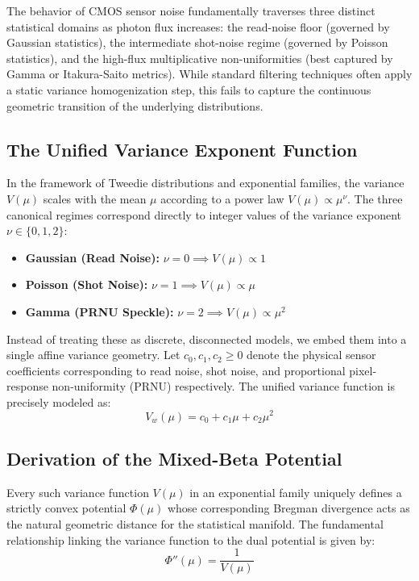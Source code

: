 
The behavior of CMOS sensor noise fundamentally traverses three distinct statistical domains as photon flux increases: the read-noise floor (governed by Gaussian statistics), the intermediate shot-noise regime (governed by Poisson statistics), and the high-flux multiplicative non-uniformities (best captured by Gamma or Itakura-Saito metrics). While standard filtering techniques often apply a static variance homogenization step, this fails to capture the continuous geometric transition of the underlying distributions.

\subsection{The Unified Variance Exponent Function}
In the framework of Tweedie distributions and exponential families, the variance $V(\mu)$ scales with the mean $\mu$ according to a power law $V(\mu) \propto \mu^\nu$. The three canonical regimes correspond directly to integer values of the variance exponent $\nu \in \{0, 1, 2\}$:
\begin{itemize}
    \item \textbf{Gaussian (Read Noise):} $\nu = 0 \implies V(\mu) \propto 1$
    \item \textbf{Poisson (Shot Noise):} $\nu = 1 \implies V(\mu) \propto \mu$
    \item \textbf{Gamma (PRNU Speckle):} $\nu = 2 \implies V(\mu) \propto \mu^2$
\end{itemize}

Instead of treating these as discrete, disconnected models, we embed them into a single affine variance geometry. Let $c_0, c_1, c_2 \ge 0$ denote the physical sensor coefficients corresponding to read noise, shot noise, and proportional pixel-response non-uniformity (PRNU) respectively. The unified variance function is precisely modeled as:
\begin{equation}
    V_w(\mu) = c_0 + c_1 \mu + c_2 \mu^2
\end{equation}

\subsection{Derivation of the Mixed-Beta Potential}
Every such variance function $V(\mu)$ in an exponential family uniquely defines a strictly convex potential $\Phi(\mu)$ whose corresponding Bregman divergence acts as the natural geometric distance for the statistical manifold. The fundamental relationship linking the variance function to the dual potential is given by:
\begin{equation}
    \Phi''(\mu) = \frac{1}{V(\mu)}
\end{equation}

